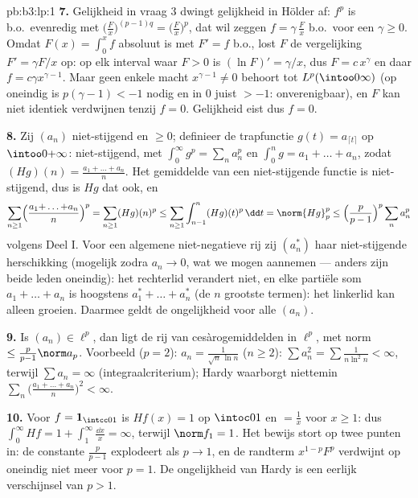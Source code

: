 \begin{solution}{pb:b3:lp:1}
\textbf{7.} Gelijkheid in vraag 3 dwingt gelijkheid in Hölder af:
$f^p$ is b.o.\ evenredig met $\bigl(\frac Fx\bigr)^{(p-1)q} =
\bigl(\frac Fx\bigr)^p$, dat wil zeggen $f = \gamma\,\frac Fx$
b.o.\ voor een $\gamma \geq 0$. Omdat $F(x) = \int_0^xf$
absoluut  is met $F' = f$ b.o., lost $F$ de vergelijking
$F' = \gamma F/x$ op: op elk interval waar $F > 0$ is $(\ln F)' =
\gamma/x$, dus $F = c\,x^{\gamma}$ en daar $f = c\gamma
x^{\gamma - 1}$. Maar geen enkele macht $x^{\gamma-1} \ne 0$
behoort tot $L^p(\intoo0\infty)$ (op oneindig is $p(\gamma - 1) <
-1$ nodig en in $0$ juist $> -1$: onverenigbaar), en $F$ kan niet
identiek verdwijnen tenzij $f = 0$. Gelijkheid eist dus $f = 0$.

\textbf{8.} Zij $(a_n)$ niet-stijgend en $\geq 0$; definieer de
trapfunctie $g(t) = a_{\lceil t\rceil}$ op $\intoo0{+\infty}$:
niet-stijgend, met $\int_0^\infty g^p = \sum_na_n^p$ en
$\int_0^ng = a_1 + \dots + a_n$, zodat $(Hg)(n) = \frac{a_1 +
\dots + a_n}n$. Het gemiddelde van een niet-stijgende functie is
niet-stijgend, dus is $Hg$ dat ook, en
\[
\sum_{n\geq1}\Bigl(\frac{a_1{+}\dots{+}a_n}n\Bigr)^p
= \sum_{n\geq1}(Hg)(n)^p
\leq \sum_{n\geq1}\int_{n-1}^n (Hg)(t)^p\,\dd t
= \norm{Hg}_p^p
\leq \Bigl(\frac p{p-1}\Bigr)^p\sum_n a_n^p
\]
volgens Deel I. Voor een algemene niet-negatieve rij zij
$(a_n^*)$ haar niet-stijgende herschikking (mogelijk zodra $a_n
\to 0$, wat we mogen aannemen --- anders zijn beide leden
oneindig): het rechterlid verandert niet, en elke partiële som
$a_1 + \dots + a_n$ is hoogstens $a_1^* + \dots + a_n^*$ (de $n$
grootste termen): het linkerlid kan alleen groeien. Daarmee geldt
de ongelijkheid voor alle $(a_n)$.

\textbf{9.} Is $(a_n) \in \ell^p$, dan ligt de rij van
cesàrogemiddelden in $\ell^p$, met norm $\leq \frac
p{p-1}\norm a_p$. Voorbeeld ($p = 2$): $a_n = \frac1{\sqrt
n\,\ln n}$ ($n \geq 2$): $\sum a_n^2 = \sum\frac1{n\ln^2n} <
\infty$, terwijl $\sum a_n = \infty$ (integraalcriterium); Hardy
waarborgt niettemin $\sum_n\bigl(\frac{a_1 + \dots + a_n}n\bigr)^2
< \infty$.

\textbf{10.} Voor $f = \mathbf 1_{\intcc01}$ is $Hf(x) = 1$ op
$\intoc01$ en $= \frac1x$ voor $x \geq 1$: dus $\int_0^\infty Hf
= 1 + \int_1^\infty\frac{\dd x}x = \infty$, terwijl $\norm f_1 =
1$. Het bewijs stort op twee punten in: de constante $\frac
p{p-1}$ explodeert als $p \to 1$, en de randterm $x^{1-p}F^p$
verdwijnt op oneindig niet meer voor $p = 1$. De ongelijkheid van
Hardy is een eerlijk verschijnsel van $p > 1$.


\end{solution}
